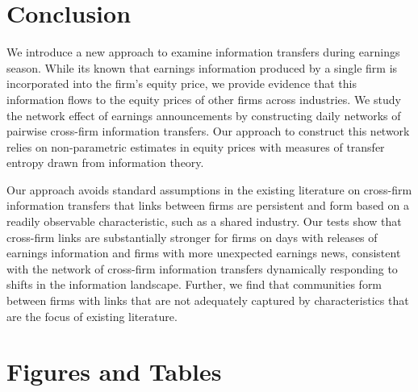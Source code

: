 \section{Conclusion}

We introduce a new approach to examine information transfers during earnings season.   While its known that earnings information produced by a single firm is incorporated into the firm's equity price,  we provide evidence that this information flows to the equity prices of other firms across industries.  We study the network effect of earnings announcements by constructing daily networks of pairwise cross-firm information transfers.  Our approach to construct this network relies on non-parametric estimates in equity prices with measures of transfer entropy drawn from information theory. 

Our approach avoids standard assumptions in the existing literature on cross-firm information transfers that links between firms are persistent and form based on a readily observable characteristic,  such as a shared industry.  Our tests show that cross-firm links are substantially stronger for firms on days with releases of earnings information and firms with more unexpected earnings news, consistent with the network of cross-firm information transfers dynamically responding to shifts in the information landscape.  Further,  we find that communities form between firms with links that are not adequately captured by characteristics that are the focus of existing literature. 





\newpage
\section{Figures and Tables}

